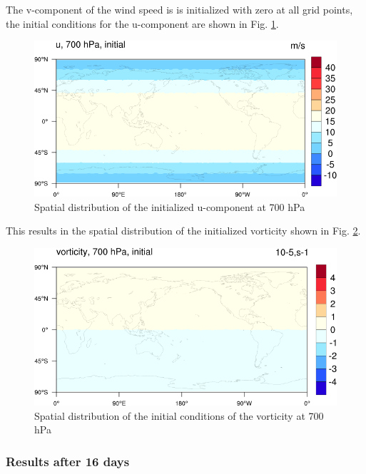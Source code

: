 The v-component of the wind speed is is initialized with zero at all grid points, the initial conditions for the u-component are shown in Fig. \ref{fig:u-initial}.

\begin{figure}[h!]%
\centering
\includegraphics[width=0.95\linewidth]{pictures/u-initial-small.png}
\caption{Spatial distribution of the initialized u-component at 700 hPa}\label{fig:u-initial}
\end{figure}


This results in the spatial distribution of the initialized 
vorticity shown in Fig. \ref{fig:vorticity-initial}.

\begin{figure}[h!]%
\centering
\includegraphics[width=0.95\linewidth]{pictures/vorticity-initial-small.png}
\caption{Spatial distribution of the initial conditions of the vorticity at 700 hPa}\label{fig:vorticity-initial}
\end{figure}

\subsubsection{Results after 16 days}



